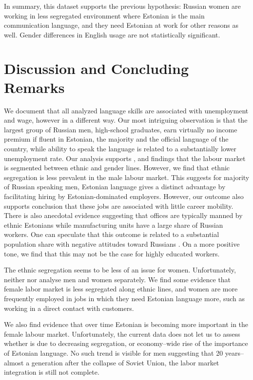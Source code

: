 \documentclass[12pt, a4paper]{article}
\begin{document}
In summary, this dataset supports the previous hypothesis: Russian women are
working in less segregated environment where Estonian is the main
communication language, and they need Estonian at work for other reasons as
well.  Gender differences in English usage are not statistically
significant.

\section{Discussion and Concluding Remarks}
\label{sec:discussion}

We document that all analyzed language skills are associated with
unemployment and wage, however in a different way. Our most
intriguing observation is that the largest group of
Russian men, high-school graduates, earn virtually no income premium if fluent in Estonian,
the majority and the official language of the country, while ability
to speak the language is related to a substantially
lower unemployment rate.
Our analysis supports \citet{YaoandOurs2015}, and \citet{Lindemann2013} findings that
the labour market is segmented between ethnic and gender lines.
However, we find that ethnic segregation is less prevalent in the male
labour market.
This suggests for majority of Russian speaking men, Estonian
language gives a distinct advantage by facilitating hiring by
Estonian-dominated employers.  However, our outcome also supports 
\citet{leppik+vihalemm2015JofBaltStud} conclusion that
these
jobs are associated with little career mobility.  There is also
anecdotal evidence suggesting that offices are
typically manned by ethnic Estonians while manufacturing units have a
large share of Russian workers.
One can speculate that this outcome is related to a substantial population share
with negative attitudes toward Russians \citep{korts2009JofBaltStud}.
On a more positive tone, we find
that this may not be the case for highly educated workers.

The ethnic segregation seems to be less of an issue for women.
Unfortunately, neither \citet{Toomet2011} nor
\citet{leppik+vihalemm2015JofBaltStud} analyse men and women
separately.  We find some evidence that female labor market is less
segregated along ethnic lines, and women are more frequently employed in jobs in which they need Estonian
language more, such as working in a direct contact with customers.

We also find evidence that over time Estonian is becoming more
important in the female labour market.  Unfortunately, the current data
does not let us to assess whether is due to decreasing segregation, or
economy--wide rise of the importance of Estonian language.  No such trend is visible for
men suggesting that 20 years--almost a generation after the collapse of Soviet Union, the
labor market integration is still not complete.
\end{document}
